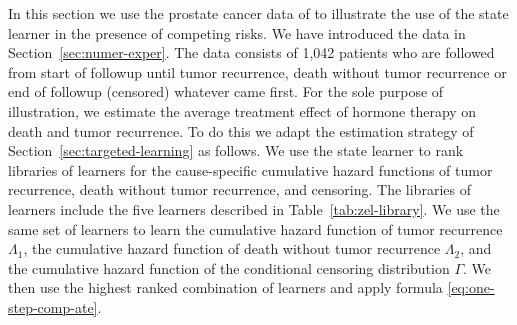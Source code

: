 \documentclass{statsoc}
\newcommand{\1}{\mathds{1}}
\begin{document}
%
In this section we use the prostate cancer data of
\cite{kattan2000pretreatment} to illustrate the use of the state
learner in the presence of competing risks. We have introduced the
data in Section~\ref{sec:numer-exper}. The data consists of 1,042
patients who are followed from start of followup until tumor
recurrence, death without tumor recurrence or end of followup
(censored) whatever came first. For the sole purpose of illustration,
we estimate the average treatment effect of hormone therapy on death
and tumor recurrence. To do this we adapt the estimation strategy of
Section~\ref{sec:targeted-learning} as follows.  We use the state
learner to rank libraries of learners for the cause-specific
cumulative hazard functions of tumor recurrence, death without tumor
recurrence, and censoring.  The libraries of learners include the five
learners described in Table~\ref{tab:zel-library}.  We use the same
set of learners to learn the cumulative hazard function of tumor
recurrence \( \Lambda_1 \), the cumulative hazard function of death
without tumor recurrence \( \Lambda_2 \), and the cumulative hazard
function of the conditional censoring distribution $\Gamma$. 
We then use the highest ranked combination
of learners and apply formula \ref{eq:one-step-comp-ate}.
\end{document}
